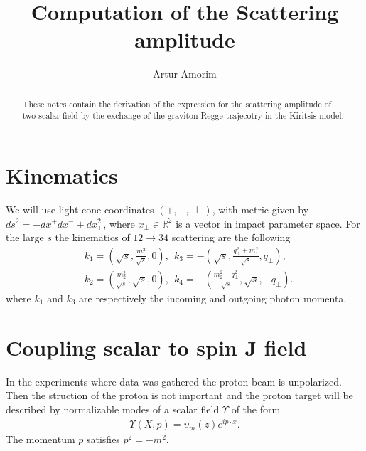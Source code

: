 \documentclass[12pt,a4paper]{article}
\begin{document}
    
\title{Computation of the Scattering amplitude}
\author{Artur Amorim}
    
\begin{abstract}
These notes contain the derivation of the expression for the scattering amplitude of two scalar field by the exchange of the graviton Regge trajecotry in the Kiritsis model.
\end{abstract}

\maketitle

\section{Kinematics}
We will use light-cone coordinates $\left( +, -, \perp \right)$, with metric given by $ds^2 = - dx^{+} dx^{-} + dx_\perp^2$, where $x_\perp \in \mathbb{R}^2$ is a vector in impact parameter space.
For the large $s$ the kinematics of  $12\to34$ scattering are the following
\begin{align}
  \label{eq:kinematics}
&k_1=\left(\!\sqrt{s},\frac{m_1^2}{\sqrt{s}} ,0\right),\  \ k_3=-\left(\!\sqrt{s},\frac{ q_\perp^2 +m_1^2}{\sqrt{s}} , q_\perp \right)\!,\\
&k_2=\left(\frac{m_2^2}{\sqrt{s}},\sqrt{s} ,0\right),\  \ k_4=-\left(\frac{m_2^2+ q_\perp^2}{\sqrt{s}},\sqrt{s} ,-q_\perp \right).
\nonumber
\end{align}
where $k_1$ and $k_3$ are  respectively the incoming  and outgoing photon momenta.

\section{Coupling scalar to spin J field}
In the experiments where data was gathered the proton beam is unpolarized. Then the struction of the proton is not important and the proton target will be described by normalizable modes of a scalar field $\Upsilon$ of the form
\begin{align}
 \Upsilon \left(X, p \right) = \upsilon_m \left(z \right) e^{i p \cdot x}.
 \label{eq:Scalar}
\end{align}
The momentum $p$ satisfies $p^2 = -m ^2$. 
\end{document}
